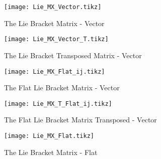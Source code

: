 \documentclass[11 pt]{article}
\begin{document}
    
    \begin{figure}
        \centering
            \texttt{[image: Lie\_MX\_Vector.tikz]} %
            \label{fig:pic} %
                \caption{\footnotesize The Lie Bracket Matrix - Vector} %
    \end{figure}
    
    \begin{figure}
        \centering
            \texttt{[image: Lie\_MX\_Vector\_T.tikz]} %
            \label{fig:pic} %
                \caption{\footnotesize The Lie Bracket Transposed Matrix - Vector} %
    \end{figure}
    
    \begin{figure}
        \centering
            \texttt{[image: Lie\_MX\_Flat\_ij.tikz]} %
            \label{fig:pic} %
                \caption{\footnotesize The Flat Lie Bracket Matrix - Vector} %
    \end{figure}
    
        \begin{figure}
        \centering
            \texttt{[image: Lie\_MX\_T\_Flat\_ij.tikz]} %
            \label{fig:pic} %
                \caption{\footnotesize The Flat Lie Bracket Matrix Transposed - Vector} %
    \end{figure}
    
    \begin{figure}
        \centering
            \texttt{[image: Lie\_MX\_Flat.tikz]} %
            \label{fig:pic} %
                \caption{\footnotesize The Lie Bracket Matrix - Flat} %
    \end{figure}   
    
\end{document}
